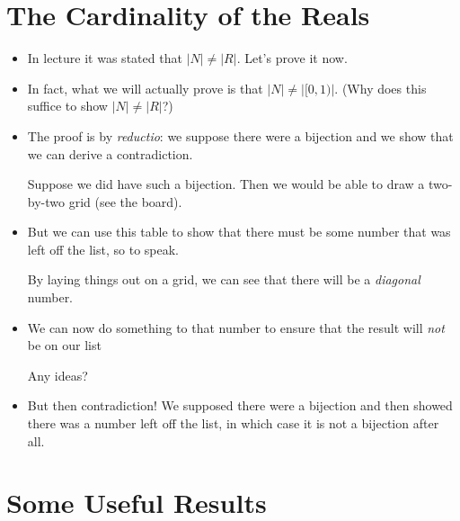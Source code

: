 \documentclass[justified]{tufte-handout}
\begin{document}
\section{The Cardinality of the Reals}

\begin{itemize}

\item In lecture it was stated that $|N| \neq |R|$. Let's prove it now. 

\item In fact, what we will actually prove is that $|N| \neq |[0,1)|$. (Why does this suffice to show $|N| \neq |R|$?)

\item The proof is by \emph{reductio}: we suppose there were a bijection and we show that we can derive a contradiction.

Suppose we did have such a bijection. Then we would be able to draw a two-by-two grid (see the board).

\item But we can use this table to show that there must be some number that was left off the list, so to speak. 

By laying things out on a grid, we can see that there will be a \emph{diagonal} number.

\item We can now do something to that number to ensure that the result will \emph{not} be on our list

Any ideas?


\item But then contradiction! We supposed there were a bijection and then showed there was a number left off the list, in which case it is not a bijection after all.


\end{itemize}

\section{Some Useful Results}
\end{document}
